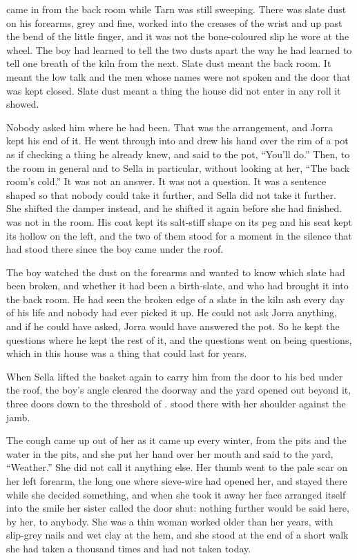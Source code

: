  came in from the back room while Tarn was still sweeping. There was slate dust on his forearms, grey and fine, worked into the creases of the wrist and up past the bend of the little finger, and it was not the bone-coloured slip he wore at the wheel. The boy had learned to tell the two dusts apart the way he had learned to tell one breath of the kiln from the next. Slate dust meant the back room. It meant the low talk and the men whose names were not spoken and the door that was kept closed. Slate dust meant a thing the house did not enter in any roll it showed.

Nobody asked him where he had been. That was the arrangement, and Jorra kept his end of it. He went through into  and drew his hand over the rim of a pot as if checking a thing he already knew, and said to the pot, “You'll do.” Then, to the room in general and to Sella in particular, without looking at her, “The back room's cold.” It was not an answer. It was not a question. It was a sentence shaped so that nobody could take it further, and Sella did not take it further. She shifted the damper instead, and he shifted it again before she had finished.  was not in the room. His coat kept its salt-stiff shape on its peg and his seat kept its hollow on the left, and the two of them stood for a moment in the silence that had stood there since the boy came under the roof.

The boy watched the dust on the forearms and wanted to know which slate had been broken, and whether it had been a birth-slate, and who had brought it into the back room. He had seen the broken edge of a slate in the kiln ash every day of his life and nobody had ever picked it up. He could not ask Jorra anything, and if he could have asked, Jorra would have answered the pot. So he kept the questions where he kept the rest of it, and the questions went on being questions, which in this house was a thing that could last for years.

\scenebreak

When Sella lifted the basket again to carry him from the door to his bed under the roof, the boy's angle cleared the doorway and the yard opened out beyond it, three doors down to the threshold of .  stood there with her shoulder against the jamb.

The cough came up out of her as it came up every winter, from the pits and the water in the pits, and she put her hand over her mouth and said to the yard, “Weather.” She did not call it anything else. Her thumb went to the pale scar on her left forearm, the long one where sieve-wire had opened her, and stayed there while she decided something, and when she took it away her face arranged itself into the smile her sister called the door shut: nothing further would be said here, by her, to anybody. She was a thin woman worked older than her years, with slip-grey nails and wet clay at the hem, and she stood at the end of a short walk she had taken a thousand times and had not taken today.

